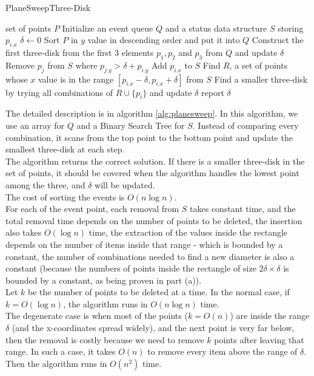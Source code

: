 \begin{algorithm}[h]
  \caption{PlaneSweepThree-Disk}
  \label{alg:planesweep}
  \begin{algorithmic}
      \Require set of points $P$
      \State Initialize an event queue $Q$ and a status data structure $S$ storing $p_{i.x}$ 
      \State $\delta \leftarrow 0$
      \State Sort $P$ in $y$ value in descending order and put it into $Q$
      \State Construct the first three-disk from the first 3 elements $p_1, p_2$ and $p_3$ from $Q$ and update $\delta$
	\State Remove $p_j$ from $S$ where  $ p_{j.y} > \delta + p_{i.y} $
	\State Add $p_{i.x}$ to $S$
	\State Find $R$, a set of points whose $x$ value is in the range  $[ p_{i.x} - \delta,  p_{i.x} + \delta ]$ from $S$
	\State Find a smaller three-disk by trying all combinations of $R \cup \{p_i\}$ and update $\delta$
	\EndIf
      \EndFor
      \State report $\delta$
\end{algorithmic}
\end{algorithm}

The detailed description is in algorithm \ref{alg:planesweep}. In this algorithm, we use an array for $Q$ and a Binary Search Tree for $S$. Instead of comparing every combination, it scans from the top point to the bottom point and update the smallest three-disk at each step. \\

The algorithm returns the correct solution. If there is a smaller three-disk in the set of points, it should be covered when the algorithm handles the lowest point among the three, and $\delta$ will be updated.\\

The cost of sorting the events is $O(n\log n)$. \\

For each of the event point, each removal from $S$ takes constant time, and the total removal time depends on the number of points to be deleted, the insertion also takes $O(\log n)$ time, the extraction of the values inside the rectangle depends on the number of items inside that range - which is bounded by a constant, the number of combinations needed to find a new diameter is also a constant (because the numbers of points inside the rectangle of size $2 \delta \times \delta$ is bounded by a constant, as being proven in part (a)).\\

Let $k$ be the number of points to be deleted at a time. In the normal case, if $k = O(\log n)$, the algorithm runs in $O(n \log n)$ time. \\

The degenerate case is when most of the points ($k = O(n)$) are inside the range $\delta$ (and the x-coordinates spread widely), and the next point is very far below, then the removal is costly because we need to remove $k$ points after leaving that range. In such a case, it takes $O(n)$ to remove every item above the range of $\delta$. Then the algorithm runs in $O(n^2)$ time.\\
